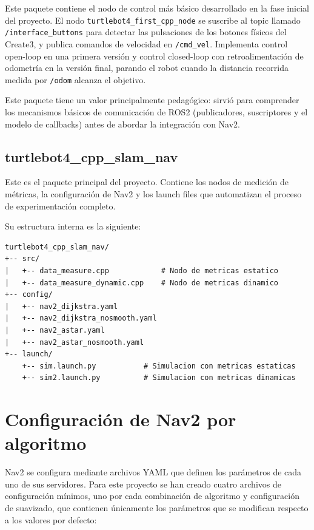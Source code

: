 Este paquete contiene el nodo de control más básico desarrollado en la fase inicial del proyecto. El nodo \texttt{turtlebot4\_first\_cpp\_node} se suscribe al topic llamado \texttt{/interface\_buttons} para detectar las pulsaciones de los botones físicos del Create3, y publica comandos de velocidad en \texttt{/cmd\_vel}. Implementa control open-loop en una primera versión y control closed-loop con retroalimentación de odometría en la versión final, parando el robot cuando la distancia recorrida medida por \texttt{/odom} alcanza el objetivo.

Este paquete tiene un valor principalmente pedagógico: sirvió para comprender los mecanismos básicos de comunicación de ROS2 (publicadores, suscriptores y el modelo de callbacks) antes de abordar la integración con Nav2.

\subsection{turtlebot4\_cpp\_slam\_nav}

Este es el paquete principal del proyecto. Contiene los nodos de medición de métricas, la configuración de Nav2 y los launch files que automatizan el proceso de experimentación completo.

Su estructura interna es la siguiente:

\vspace{1em}
\begin{minipage}{\linewidth}
\begin{verbatim}
turtlebot4_cpp_slam_nav/
+-- src/
|   +-- data_measure.cpp            # Nodo de metricas estatico
|   +-- data_measure_dynamic.cpp    # Nodo de metricas dinamico
+-- config/
|   +-- nav2_dijkstra.yaml
|   +-- nav2_dijkstra_nosmooth.yaml
|   +-- nav2_astar.yaml
|   +-- nav2_astar_nosmooth.yaml
+-- launch/
    +-- sim.launch.py           # Simulacion con metricas estaticas
    +-- sim2.launch.py          # Simulacion con metricas dinamicas
\end{verbatim}
\end{minipage}
\vspace{1em}

\section{Configuración de Nav2 por algoritmo}

Nav2 se configura mediante archivos YAML que definen los parámetros de cada uno de sus servidores. Para este proyecto se han creado cuatro archivos de configuración mínimos, uno por cada combinación de algoritmo y configuración de suavizado, que contienen únicamente los parámetros que se modifican respecto a los valores por defecto:

